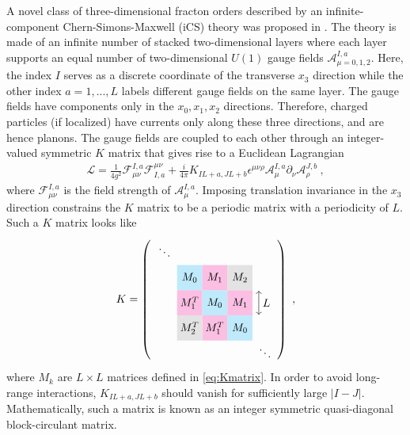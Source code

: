 \documentclass[aps,prb,twocolumn,superscriptaddress,floatfix,10pt,nofootinbib]{revtex4-2}
\newcommand{\ie}{\begin{equation}\begin{aligned}}
\newcommand{\fe}{\end{aligned}\end{equation}}
\theoremstyle{definition}
\begin{document}
A novel class of three-dimensional fracton orders described by an infinite-component Chern-Simons-Maxwell (iCS) theory was proposed in \cite{Ma:2020svo}. The theory is made of an infinite number of stacked two-dimensional layers where each layer supports an equal number of two-dimensional $U(1)$ gauge fields $\mathcal{A}_{\mu=0,1,2}^{I,a}$. Here, the index $I$ serves as a discrete coordinate of the transverse $x_3$ direction while the other index $a=1,...,L$ labels different gauge fields on the same layer. The gauge fields have components only in the $x_0,x_1,x_2$ directions. Therefore, charged particles (if localized) have currents only along these three directions, and are hence planons. 
The gauge fields are coupled to each other through an integer-valued symmetric $K$ matrix that gives rise to a Euclidean Lagrangian
\ie\label{eq:action}
\mathcal{L}=\frac{1}{4g^2}\mathcal{F}^{I,a}_{\mu\nu}\mathcal{F}^{\mu\nu}_{I,a}+\frac{i}{4\pi} K_{IL+a,JL+b}\epsilon^{\mu\nu\rho} \mathcal{A}^{I,a}_\mu \partial_\nu \mathcal{A}^{J,b}_\rho~,
\fe
where $\mathcal{F}^{I,a}_{\mu\nu}$ is the field strength of $\mathcal{A}^{I,a}_\mu$. Imposing translation invariance in the $x_3$ direction constrains the $K$ matrix to be a periodic matrix with a periodicity of $L$. Such a $K$ matrix looks like
\ie\label{eq:Kmatrix_pic}
K=\left(\vcenter{\hbox{
    \begin{tikzpicture}[scale=1]
        \fill[cyan!25, draw=none] (-0.4, 0.4) rectangle (0.4, -0.4);
        \fill[cyan!25, draw=none] (-0.4, 0.4) rectangle (-1.2, 1.2);
        \fill[cyan!25, draw=none] (0.4, -0.4) rectangle (1.2, -1.2);
        \fill[magenta!25, draw=none] (0.4, 0.4) rectangle (1.2, -0.4);
        \fill[magenta!25, draw=none] (-0.4, 1.2) rectangle (0.4, 0.4);
        \fill[magenta!25, draw=none] (-1.2, 0.4) rectangle (-0.4, -0.4);
        \fill[magenta!25, draw=none] (-0.4, -0.4) rectangle (0.4, -1.2);
        \fill[gray!22, draw=none] (-1.2, -0.4) rectangle (-0.4, -1.2);
        \fill[gray!22, draw=none] (0.4, 1.2) rectangle (1.2, 0.4);
        \node at (0.8,0.8) {$M_2$};
        \node at (-0.8,-0.8) {$M_2^T$};
        \node at (1.6, -1.5) {$\ddots$};
        \node at (-1.6, 1.7) {$\ddots$};
        \node at (0,0) {$M_0$};
        \node at (-0.8,0.8) {$M_0$};
        \node at (0.8,-0.8) {$M_0$};
        \node at (0.8,0) {$M_1$};
        \node at (0,0.8) {$M_1$};
        \node at (-0.8,0) {$M_1^T$};
        \node at (0,-0.8) {$M_1^T$};
        \draw[<->] (1.4, 0.38) -- (1.4, -0.38) node[midway, right] {$L$};
    \end{tikzpicture}}}\, \right)~,
\fe
where $M_k$ are $L\times L$ matrices defined in \eqref{eq:Kmatrix}. In order to avoid long-range interactions, $K_{IL+a,JL+b}$ should vanish for sufficiently large $|I-J|$. Mathematically, such a matrix is known as an integer symmetric quasi-diagonal block-circulant matrix.
\end{document}

